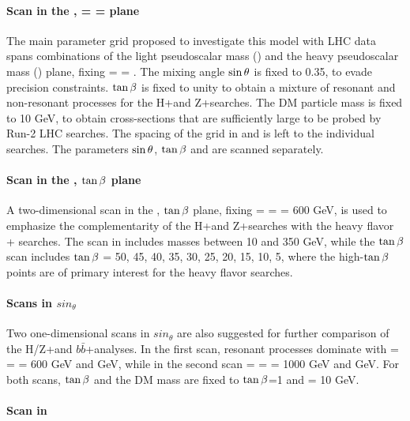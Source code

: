 \paragraph{Scan in the \ma, \mA = \mH = \mHc plane}
The main parameter grid proposed to investigate this model with LHC data spans combinations of the light pseudoscalar mass (\ma) and the heavy pseudoscalar mass (\mA) plane, fixing \mA = \mH = \mHc. The mixing angle $\sin\theta$ is fixed to 0.35, to evade precision constraints. $\tan\beta$ is fixed to unity to obtain a mixture of resonant and non-resonant processes for the H+\MET and Z+\MET searches. The DM particle mass is fixed to 10 GeV, to obtain cross-sections that are sufficiently large to be probed by Run-2 LHC searches. The spacing of the grid in \ma and \mA is left to the individual searches. The parameters $\sin\theta$, $\tan\beta$ and \mDM are scanned separately.

\paragraph{Scan in the \ma, $\tan\beta$ plane}
A two-dimensional scan in the \ma, $\tan\beta$ plane, fixing \mA = \mH = \mHc = 600 GeV, is used to emphasize the complementarity of the H+\MET and Z+\MET searches with the heavy flavor + \MET searches. The scan in \ma includes masses between 10 and 350 GeV, while the $\tan\beta$ scan includes $\tan\beta$ = 50, 45, 40, 35, 30, 25, 20, 15, 10, 5, where the high-$\tan\beta$ points are of primary interest for the heavy flavor searches. 

\paragraph{Scans in $sin_{\theta}$}

Two one-dimensional scans in $sin_{\theta}$ are also suggested for further comparison of the H/Z+\MET and $b\bar{b}$+\MET analyses. In the first scan, resonant processes dominate with \mA = \mH = \mHc = 600 GeV and  GeV, while in the second scan \mA = \mH = \mHc = 1000 GeV and  GeV. For both scans, $\tan\beta$ and the DM mass are fixed to $\tan\beta$=1 and \mDM = 10 GeV. 

\paragraph{Scan in \mDM}

